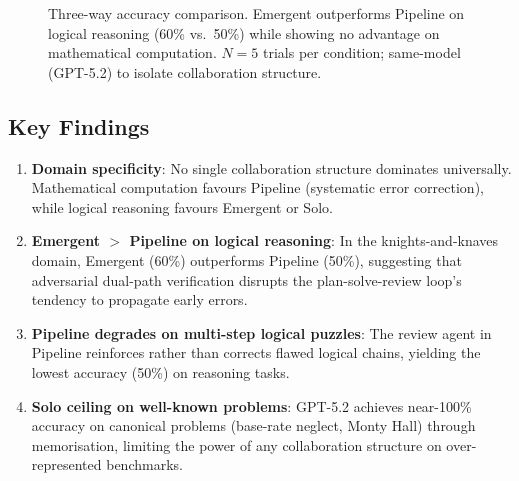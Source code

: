 \documentclass[12pt]{article}
\begin{document}
\begin{figure}[h!]
\centering
{}
\caption{Three-way accuracy comparison. Emergent outperforms Pipeline on logical
reasoning (60\% vs.\ 50\%) while showing no advantage on mathematical
computation. $N=5$ trials per condition; same-model (GPT-5.2) to isolate
collaboration structure.}
\label{fig:threeway_bar}
\end{figure}

\subsection*{Key Findings}

\begin{enumerate}
  \item \textbf{Domain specificity}: No single collaboration structure dominates
        universally. Mathematical computation favours Pipeline (systematic error
        correction), while logical reasoning favours Emergent or Solo.
  \item \textbf{Emergent $>$ Pipeline on logical reasoning}: In the
        knights-and-knaves domain, Emergent (60\%) outperforms Pipeline (50\%),
        suggesting that adversarial dual-path verification disrupts the
        plan-solve-review loop's tendency to propagate early errors.
  \item \textbf{Pipeline degrades on multi-step logical puzzles}: The review
        agent in Pipeline reinforces rather than corrects flawed logical chains,
        yielding the lowest accuracy (50\%) on reasoning tasks.
  \item \textbf{Solo ceiling on well-known problems}: GPT-5.2 achieves
        near-100\% accuracy on canonical problems (base-rate neglect, Monty Hall)
        through memorisation, limiting the power of any collaboration structure
        on over-represented benchmarks.
\end{enumerate}
\end{document}
